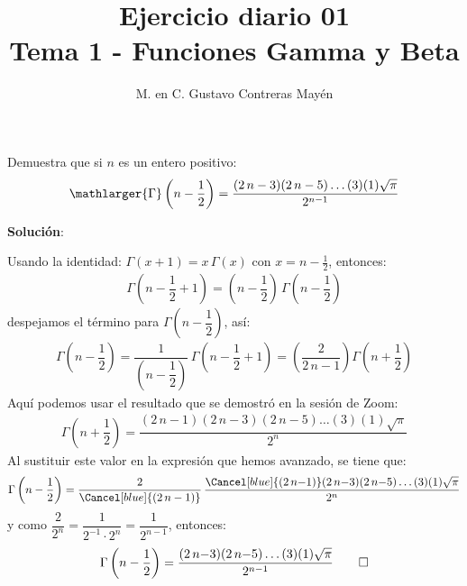 
\usepackage{titling}
\setlength{\droptitle}{-2cm}
\title{Ejercicio diario 01 \\[0.3em]  \large{Tema 1 - Funciones Gamma y Beta} \vspace{-3ex}}
\author{M. en C. Gustavo Contreras Mayén}
\date{ }



\vspace{-7ex}
\maketitle
\fontsize{14}{14}\selectfont

Demuestra que si $n$ es un entero positivo:
\begin{align*}
\mathlarger{\Gamma} \left( n - \dfrac{1}{2} \right) = \dfrac{(2 \, n - 3)(2 \, n - 5) \ldots (3)(1) \sqrt{\pi}}{2^{n-1}}
\end{align*}

\noindent
\textbf{Solución}:

Usando la identidad: $\Gamma(x + 1) = x \, \Gamma(x)$ con $x = n - \frac{1}{2}$, entonces:
\begin{align*}
\Gamma \left( n - \dfrac{1}{2} + 1 \right) = \left(n - \dfrac{1}{2} \right) \, \Gamma \left( n - \dfrac{1}{2} \right)
\end{align*}
despejamos el término para $\Gamma \left( n - \dfrac{1}{2} \right)$, así:
\begin{align*}
\Gamma \left( n - \dfrac{1}{2} \right) = \dfrac{1}{\left(n - \dfrac{1}{2} \right)} \, \Gamma \left( n - \dfrac{1}{2} + 1 \right) = \left( \dfrac{2}{2 \, n - 1} \right) \Gamma \left( n + \dfrac{1}{2} \right)
\end{align*}
Aquí podemos usar el resultado que se demostró en la sesión de Zoom:
\begin{align*}
\Gamma \left( n + \dfrac{1}{2} \right) =  \dfrac{(2 \, n {-} 1)(2 \, n {-} 3)(2 \, n {-} 5) \ldots (3)(1)\sqrt{\pi}}{2^{n}}
\end{align*}
Al sustituir este valor en la expresión que hemos avanzado, se tiene que:
\begin{align*}
\Gamma \left( n - \dfrac{1}{2} \right) = \dfrac{2}{\Cancel[blue]{(2 \, n - 1)}} \,  \dfrac{\Cancel[blue]{(2 \, n {-} 1)}(2 \, n {-} 3)(2 \, n {-} 5) \ldots (3)(1)\sqrt{\pi}}{2^{n}}
\end{align*}
y como $\dfrac{2}{2^{n}} = \dfrac{1}{2^{-1} \cdot 2^{n}} = \dfrac{1}{2^{n-1}}$, entonces:
\begin{align*}
\Gamma \left( n - \dfrac{1}{2} \right) = \dfrac{(2 \, n {-} 3)(2 \, n {-} 5) \ldots (3)(1)\sqrt{\pi}}{2^{n-1}} \qed
\end{align*}

